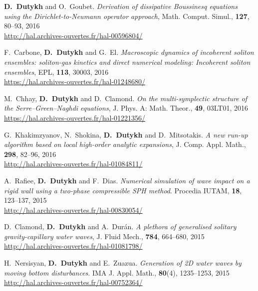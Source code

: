 \documentclass[final, a4paper, oneside, 12pt]{article}
\numberwithin{equation}{section}
\begin{document}
\begin{etaremune}
  \item \textbf{D.~Dutykh} and O.~Goubet. \textit{Derivation of dissipative Boussinesq equations using the Dirichlet-to-Neumann operator approach}, Math. Comput. Simul., \textbf{127}, 80--93, 2016 \\ %
  \url{http://hal.archives-ouvertes.fr/hal-00596804/}
  
  \item F.~Carbone, \textbf{D.~Dutykh} and G.~El. \textit{Macroscopic dynamics of incoherent soliton ensembles: soliton-gas kinetics and direct numerical modeling: Incoherent soliton ensembles}, EPL, \textbf{113}, 30003, 2016 \\ %
  \url{https://hal.archives-ouvertes.fr/hal-01248680/}
  
  \item M.~Chhay, \textbf{D.~Dutykh} and D.~Clamond. \textit{On the multi-symplectic structure of the Serre--Green--Naghdi equations}, J. Phys. A: Math. Theor., \textbf{49}, 03LT01, 2016 \\ %
  \url{https://hal.archives-ouvertes.fr/hal-01221356/}
  
  \item G.~Khakimzyanov, N.~Shokina, \textbf{D.~Dutykh} and D.~Mitsotakis. \textit{A new run-up algorithm based on local high-order analytic expansions}, J. Comp. Appl. Math., \textbf{298}, 82--96, 2016 \\ %
  \url{http://hal.archives-ouvertes.fr/hal-01084811/}
  
  
  \item A.~Rafiee, \textbf{D.~Dutykh} and F.~Dias. \textit{Numerical simulation of wave impact on a rigid wall using a two-phase compressible SPH method}. Procedia IUTAM, \textbf{18}, 123--137, 2015 \\ %
  \url{http://hal.archives-ouvertes.fr/hal-00830054/}

  \item D.~Clamond, \textbf{D.~Dutykh} and A.~Dur\'an. \textit{A plethora of generalised solitary gravity-capillary water waves}, J. Fluid Mech., \textbf{784}, 664--680, 2015 \\ %
  \url{http://hal.archives-ouvertes.fr/hal-01081798/}
  
  \item H.~Nersisyan, \textbf{D.~Dutykh} and E.~Zuazua. \textit{Generation of 2D water waves by moving bottom disturbances}. IMA J. Appl. Math., \textbf{80}(4), 1235--1253, 2015 \\ %
  \url{http://hal.archives-ouvertes.fr/hal-00752364/}
  

\end{etaremune}
\end{document}
